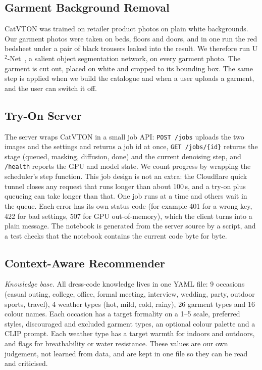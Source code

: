 \documentclass{article}
\newcommand{\unet}{U$^2$-Net}
\begin{document}
\subsection{Garment Background Removal}

CatVTON was trained on retailer product photos on plain white backgrounds. Our garment photos were
taken on beds, floors and doors, and in one run the red bedsheet under a pair of black trousers leaked
into the result. We therefore run \unet~\cite{u2net}, a salient object segmentation network, on every
garment photo. The garment is cut out, placed on white and cropped to its bounding box. The same step
is applied when we build the catalogue and when a user uploads a garment, and the user can switch it off.

\subsection{Try-On Server}

The server wraps CatVTON in a small job API: \texttt{POST /jobs} uploads the two images and the settings
and returns a job id at once, \texttt{GET /jobs/\{id\}} returns the stage (queued, masking, diffusion,
done) and the current denoising step, and \texttt{/health} reports the GPU and model state. We count
progress by wrapping the scheduler's step function. This job design is not an extra: the Cloudflare
quick tunnel closes any request that runs longer than about 100\,s, and a try-on plus queueing can take
longer than that. One job runs at a time and others wait in the queue. Each error has its own status
code (for example 401 for a wrong key, 422 for bad settings, 507 for GPU out-of-memory), which the
client turns into a plain message. The notebook is generated from the server source by a script, and
a test checks that the notebook contains the current code byte for byte.

\subsection{Context-Aware Recommender}
\label{sec:rec}

\emph{Knowledge base.} All dress-code knowledge lives in one YAML file: 9 occasions (casual outing,
college, office, formal meeting, interview, wedding, party, outdoor sports, travel), 4 weather types
(hot, mild, cold, rainy), 26 garment types and 16 colour names. Each occasion has a target formality on
a 1--5 scale, preferred styles, discouraged and excluded garment types, an optional colour palette and a
CLIP prompt. Each weather type has a target warmth for indoors and outdoors, and flags for
breathability or water resistance. These values are our own judgement, not learned from data, and are
kept in one file so they can be read and criticised.
\end{document}
